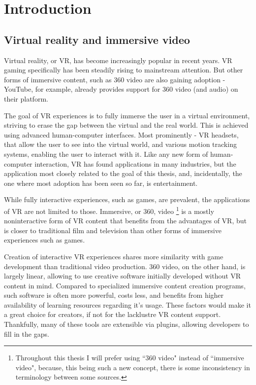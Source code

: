 \chapter{Introduction}

\section*{Virtual reality and immersive video}
Virtual reality, or VR, has become increasingly popular in recent years. 
VR gaming specifically has been steadily rising to mainstream attention. 
But other forms of immersive content, such as 360\degree{} video 
are also gaining adoption - YouTube, for example, already provides support for 360\degree{} video
(and audio) on their platform.

The goal of VR experiences is to fully immerse the user in a virtual environment, striving to erase the gap between the virtual and the real world.
This is achieved using advanced human-computer interfaces. Most prominently - VR headsets, that allow the user to see into the virtual world, 
and various motion tracking systems, enabling the user to interact with it.
Like any new form of human-computer interaction, VR has found applications in many industries,
but the application most closely related to the goal of this thesis, and, incidentally, the one where most adoption has been seen so far, is entertainment.

While fully interactive experiences, such as games, are prevalent, the applications of VR are not limited to those.
Immersive, or 360\degree{}, video
\footnote{Throughout this thesis I will prefer using ``360\degree{} video" instead of ``immersive video",
because, this being such a new concept, there is some inconsistency in terminology between some sources.}
is a mostly noninteractive form of VR content that benefits from the advantages of VR, 
but is closer to traditional film and television than other forms of immersive experiences such as games.

Creation of interactive VR experiences shares more similarity with game development than traditional video production.
360\degree{} video, on the other hand,
is largely linear, allowing to use creative software initially developed without VR content in mind.
Compared to specialized immersive content creation programs, such software
is often more powerful, costs less, and benefits from higher availability of learning resources regarding it's usage.
These factors would make it a great choice for creators, if not for the lacklustre VR content support.
Thankfully, many of these tools are extensible via plugins, allowing developers to fill in the gaps.

